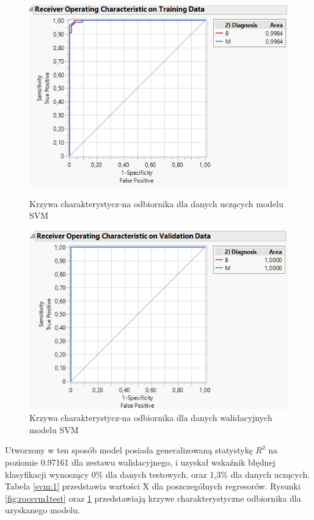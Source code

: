 \begin{figure}[!ht]
	\begin{minipage}{0.48\textwidth}
		\centering
		\includegraphics[width=0.98\linewidth]{Rysunki/Rozdzial3/roc_svm1_test}
		\caption{Krzywa charakterystycz-na odbiornika dla danych uczących modelu SVM}
		\label{fig:rocsvm1test}		
	\end{minipage}%
	\hspace{10pt}
	\begin{minipage}{0.48\textwidth}
		\centering
		\includegraphics[width=0.98\linewidth]{Rysunki/Rozdzial3/roc_svm1_val}
		\caption{Krzywa charakterystycz-na odbiornika dla danych walidacyjnych modelu SVM}
		\label{fig:rocsvm1val}				
	\end{minipage}	
\end{figure}

Utworzony w ten sposób model posiada generalizowaną statystykę $R^{2}$ na poziomie 0.97161 dla zestawu walidacyjnego, i uzyskał wskaźnik błędnej klasyfikacji wynoszący 0\% dla danych testowych, oraz 1,3\% dla danych uczących. Tabela \ref{svm:1} przedstawia wartości X dla poszczególnych regresorów. Rysunki \ref{fig:rocsvm1test} oraz \ref{fig:rocsvm1val} przedstawiają krzywe charakterystyczne odbiornika dla uzyskanego modelu.